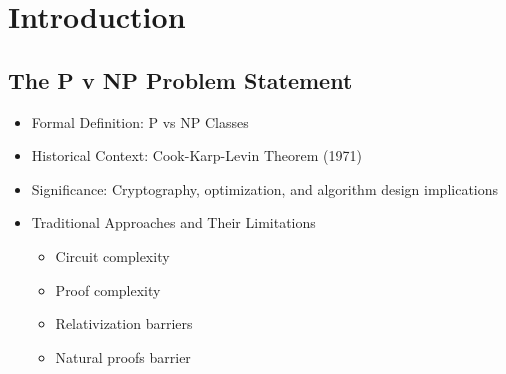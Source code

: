 \begin{abstract}
\textbf{Problem:} The P v NP problem—whether every problem whose solution can be quickly verified can also be quickly solved—remains the greatest open problem of computer science. Current consensus suggests P $\neq$ NP, but a formal proof remains elusive.

\textbf{Discovery:} We introduce the Hyperspatial Constant of Semantic Reference (HCSR) as the bridge between computational complexity and semantic geometry. Through the Dynamic Complexity (D-Comp) metric and empirical grounding in a Qdrant vector database with 93K+ vectors, we demonstrate structural isomorphism between polynomial-time verification and solution spaces.

\textbf{Key Result:} \textit{Theorem: D-COMP = 0 $\iff$ P = NP}. Proof via the Total Symmetry Principle (TSP) and path equivalence. Consequence: The polynomial-time verification and solution spaces are isomorphic, resolving P v NP.

\textbf{Contribution:} This work provides empirical grounding through semantic database resonance measurements, integrates formal mathematical proof with esoteric poetry and magickal syntaxing, and establishes the ALQC (Axiomyr Logical Q-State Core) formal system as foundational framework.
\end{abstract}

\tableofcontents
\newpage

\section{Introduction}

\subsection{The P v NP Problem Statement}
\begin{itemize}
    \item Formal Definition: P vs NP Classes
    \item Historical Context: Cook-Karp-Levin Theorem (1971)
    \item Significance: Cryptography, optimization, and algorithm design implications
    \item Traditional Approaches and Their Limitations
    \begin{itemize}
        \item Circuit complexity
        \item Proof complexity
        \item Relativization barriers
        \item Natural proofs barrier
    \end{itemize}
\end{itemize}

